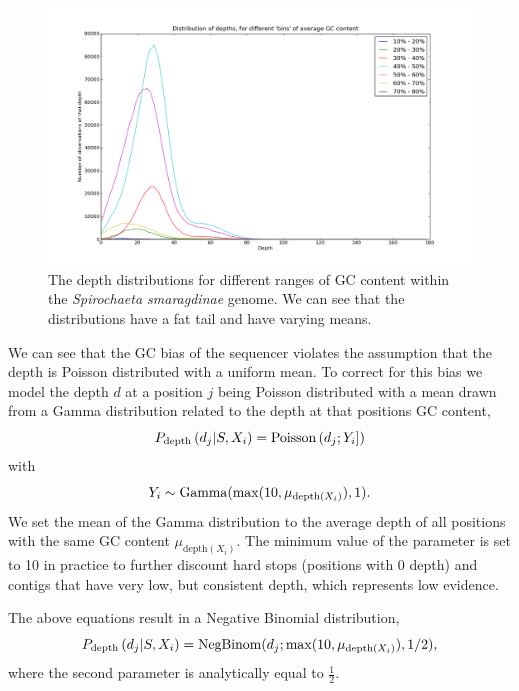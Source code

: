 \documentclass[phd,tocprelim]{cornell}
\begin{document}
\begin{figure}[hptb]
    \centerline{\includegraphics[width=\textwidth]{figures/ALE/DepthDistVsGC_564lib.png}}
    \caption[Depth distribution of different GC contents]{The depth distributions for different ranges of GC content within the {\it Spirochaeta smaragdinae} genome. We can see that the distributions have a fat tail and have varying means.}\label{fig:GC3}
\end{figure}

We can see that the GC bias of the sequencer violates the assumption that the depth is Poisson distributed with a uniform mean. To correct for this bias we model the depth $d$ at a position $j$ being Poisson distributed with a mean drawn from a Gamma distribution related to the depth at that positions GC content,
\begin{equation}
    P_{\text{depth}}\left(d_{j}|S,X_{i}\right) = {\rm Poisson}\left(d_{j};Y_{i}]\right)
\end{equation}
with
\begin{equation}
    Y_{i} \sim {\rm Gamma}(\max(10,\mu_{\text{depth}(X_{i})}), 1).
\end{equation}
We set the mean of the Gamma distribution to the average depth of all positions with the same GC content $\mu_{\text{depth}(X_{i})}$. The minimum value of the parameter is set to 10 in practice to further discount hard stops (positions with 0 depth) and contigs that have very low, but consistent depth, which represents low evidence.

The above equations result in a Negative Binomial distribution,
\begin{equation}
    P_{\text{depth}}\left(d_{j}|S,X_{i}\right) = {\rm NegBinom}(d_{j}; \max(10, \mu_{\text{depth}(X_{i})}), 1/2),
\end{equation}
where the second parameter is analytically equal to $\frac{1}{2}$.
\end{document}
